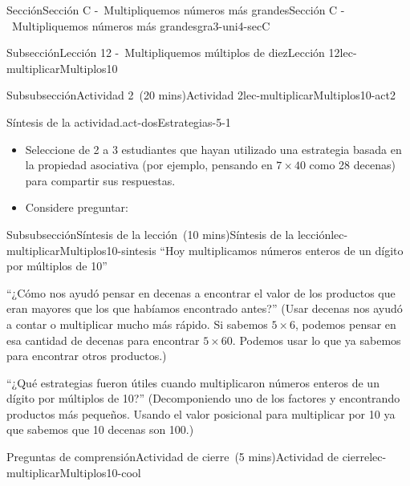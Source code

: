 \documentclass[oneside,10pt,]{article}
\newlength{\fillinmaxwidth}
\newlength{\fillincontract}
\newlength{\charmaxwidth}\setlength{\charmaxwidth}{0.5em}
\newlength{\charminwidth}\setlength{\charminwidth}{0.1em}
\newlength{\fillinheight}
\newcommand{\fillintext}[1]{%
\setlength{\fillinmaxwidth}{#1\charmaxwidth}%
\setlength{\fillincontract}{#1\charminwidth}%
\setlength{\fillinheight}{\baselineskip}\addtolength{\fillinheight}{1.2pt}%
\strut\nobreak\leaders\vbox{\hrule width 0.3pt height 0.3pt \vskip -1.2pt}\hskip 1\fillinmaxwidth minus \fillincontract\nobreak\strut%
}
\begin{document}
\begin{sectionptx}{Sección}{Sección C -~Multipliquemos números más grandes}{}{Sección C -~Multipliquemos números más grandes}{}{}{gra3-uni4-secC}
\begin{subsectionptx}{Subsección}{Lección 12 -~Multipliquemos múltiplos de diez}{}{Lección 12}{}{}{lec-multiplicarMultiplos10}
\begin{subsubsectionptx}{Subsubsección}{Actividad 2~(20 mins)}{}{Actividad 2}{}{}{lec-multiplicarMultiplos10-act2}
\begin{paragraphs}{Síntesis de la actividad.}{act-dosEstrategias-5-1}
\begin{itemize}[label=\textbullet]
\item{}Seleccione de 2 a 3 estudiantes que hayan utilizado una estrategia basada en la propiedad asociativa (por ejemplo, pensando en \(7 \times 40\) como 28 decenas) para compartir sus respuestas.%
\item{}Considere preguntar:%
%
\end{itemize}
\end{paragraphs}%
\end{subsubsectionptx}
%
%
\typeout{************************************************}
\typeout{************************************************}
%
\begin{subsubsectionptx}{Subsubsección}{Síntesis de la lección~(10 mins)}{}{Síntesis de la lección}{}{}{lec-multiplicarMultiplos10-sintesis}
``Hoy multiplicamos números enteros de un dígito por múltiplos de 10''%
\par
``¿Cómo nos ayudó pensar en decenas a encontrar el valor de los productos que eran mayores que los que habíamos encontrado antes?'' (Usar decenas nos ayudó a contar o multiplicar mucho más rápido. Si sabemos \(5 \times 6\), podemos pensar en esa cantidad de decenas para encontrar \(5 \times 60\). Podemos usar lo que ya sabemos para encontrar otros productos.)%
\par
``¿Qué estrategias fueron útiles cuando multiplicaron números enteros de un dígito por múltiplos de 10?'' (Decomponiendo uno de los factores y encontrando productos más pequeños. Usando el valor posicional para multiplicar por 10 ya que sabemos que 10 decenas son 100.)%
\end{subsubsectionptx}
%
%
\typeout{************************************************}
\typeout{************************************************}
%
\begin{reading-questions-subsubsection}{Preguntas de comprensión}{Actividad de cierre~(5 mins)}{}{Actividad de cierre}{}{}{lec-multiplicarMultiplos10-cool}

\end{reading-questions-subsubsection}
\end{subsectionptx}
\end{sectionptx}
\end{document}
